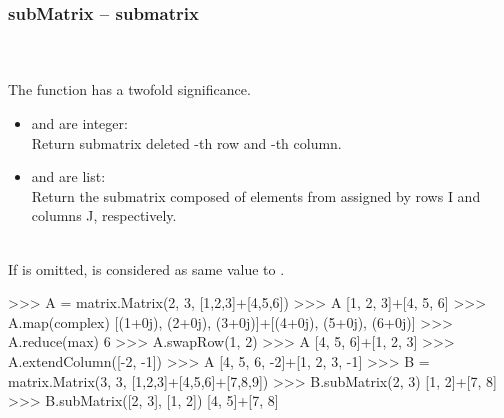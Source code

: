   \subsubsection{subMatrix -- submatrix}
   \\
   \\
   \spacing
   \quad The function has a twofold significance.
   \begin{itemize}
     \item {} and  are integer:\\
       Return submatrix deleted -th row and -th column.
     \item {} and  are list:\\
       Return the submatrix composed of elements from  assigned by rows I and columns J, respectively. 
   \end{itemize}
   \quad\\
   \spacing
   \quad If  is omitted,  is considered as same value to .
\begin{ex}
>>> A = matrix.Matrix(2, 3, [1,2,3]+[4,5,6])
>>> A
[1, 2, 3]+[4, 5, 6]
>>> A.map(complex)
[(1+0j), (2+0j), (3+0j)]+[(4+0j), (5+0j), (6+0j)]
>>> A.reduce(max)
6
>>> A.swapRow(1, 2)
>>> A
[4, 5, 6]+[1, 2, 3]
>>> A.extendColumn([-2, -1])
>>> A
[4, 5, 6, -2]+[1, 2, 3, -1]
>>> B = matrix.Matrix(3, 3, [1,2,3]+[4,5,6]+[7,8,9])
>>> B.subMatrix(2, 3)
[1, 2]+[7, 8]
>>> B.subMatrix([2, 3], [1, 2])
[4, 5]+[7, 8]
\end{ex}%
\C

